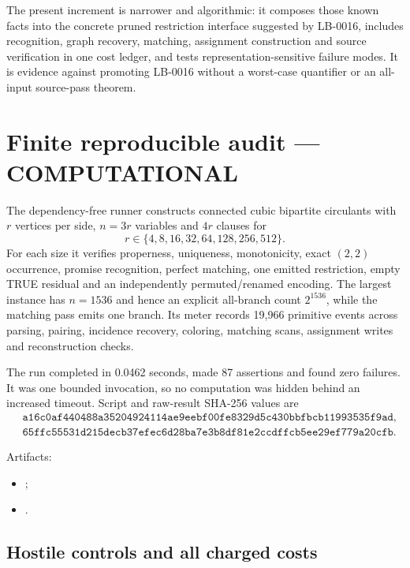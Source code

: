 \documentclass[11pt]{article}
\newcommand{\COMP}{\textbf{COMPUTATIONAL}}
\begin{document}
The present increment is narrower and algorithmic: it composes those known
facts into the concrete pruned restriction interface suggested by LB-0016,
includes recognition, graph recovery, matching, assignment construction and
source verification in one cost ledger, and tests representation-sensitive
failure modes.  It is evidence against promoting LB-0016 without a
worst-case quantifier or an all-input source-pass theorem.

\section{Finite reproducible audit --- \COMP}

The dependency-free runner constructs connected cubic bipartite circulants
with $r$ vertices per side, $n=3r$ variables and $4r$ clauses for
\[
 r\in\{4,8,16,32,64,128,256,512\}.
\]
For each size it verifies properness, uniqueness, monotonicity, exact
$(2,2)$ occurrence, promise recognition, perfect matching, one emitted
restriction, empty TRUE residual and an independently permuted/renamed
encoding.  The largest instance has $n=1536$ and hence an explicit
all-branch count $2^{1536}$, while the matching pass emits one branch.  Its
meter records 19,966 primitive events across parsing, pairing, incidence
recovery, coloring, matching scans, assignment writes and reconstruction
checks.

The run completed in 0.0462 seconds, made 87 assertions and found zero
failures.  It was one bounded invocation, so no computation was hidden behind
an increased timeout.  Script and raw-result SHA-256 values are
\begin{align*}
&\texttt{a16c0af440488a35204924114ae9eebf00fe8329d5c430bbfbcb11993535f9ad},\\
&\texttt{65ffc55531d215decb37efec6d28ba7e3b8df81e2ccdffcb5ee29ef779a20cfb}.
\end{align*}

Artifacts:
\begin{itemize}[leftmargin=1.5em]
\item {};
\item {}.
\end{itemize}

\subsection*{Hostile controls and all charged costs}
\end{document}

